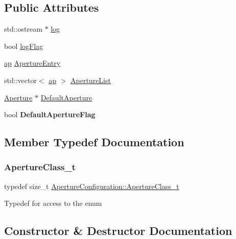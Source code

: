 \subsection*{Public Attributes}
\begin{DoxyCompactItemize}
\item 
std\+::ostream $\ast$ \hyperlink{classApertureConfiguration_a14da0e53d6b7306ad417dfa51f4d7470}{log}
\item 
bool \hyperlink{classApertureConfiguration_ad4005122e0a206a8376407ed8c54c0f6}{log\+Flag}
\item 
\hyperlink{structApertureConfiguration_1_1ap}{ap} \hyperlink{classApertureConfiguration_a20692047dd6ec339da5bf9e80f9f9f3c}{Aperture\+Entry}
\item 
std\+::vector$<$ \hyperlink{structApertureConfiguration_1_1ap}{ap} $>$ \hyperlink{classApertureConfiguration_a4b70556fb8ac55e8fb5d3d3e0b75b039}{Aperture\+List}
\item 
\hyperlink{classAperture}{Aperture} $\ast$ \hyperlink{classApertureConfiguration_a3b08ff20e5bbbb3d28d73048e1933f9f}{Default\+Aperture}
\item 
\mbox{\label{classApertureConfiguration_ac7d2024a3d3b062f50733c2106fba998}} 
bool {\bfseries Default\+Aperture\+Flag}
\end{DoxyCompactItemize}


\subsection{Member Typedef Documentation}
\mbox{\label{classApertureConfiguration_a84c9eaffaf4394f1538d2ec57a85c706}} 
\subsubsection{\texorpdfstring{Aperture\+Class\+\_\+t}{ApertureClass\_t}}
{\footnotesize\ttfamily typedef size\+\_\+t \hyperlink{classApertureConfiguration_a84c9eaffaf4394f1538d2ec57a85c706}{Aperture\+Configuration\+::\+Aperture\+Class\+\_\+t}}

Typedef for access to the enum 

\subsection{Constructor \& Destructor Documentation}
\mbox{\label{classApertureConfiguration_ac9b95b8adbd178d7345cd147000d7038}} 
